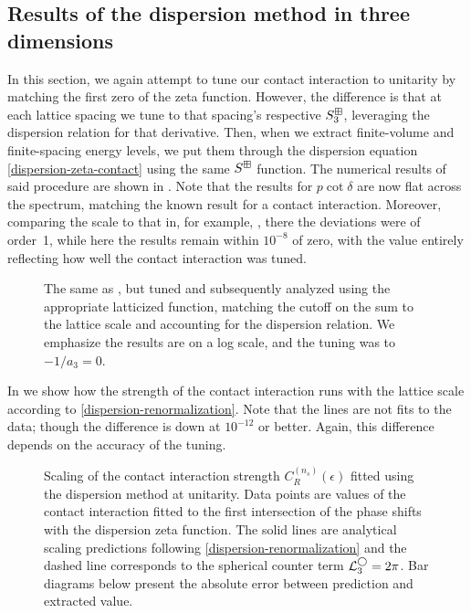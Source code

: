 
\subsection{Results of the dispersion method in three dimensions}

In this section, we again attempt to tune our contact interaction to unitarity by matching the first zero of the zeta function.
However, the difference is that at each lattice spacing we tune to that spacing's respective $S^{\boxplus}_3$, leveraging the dispersion relation for that derivative.
Then, when we extract finite-volume and finite-spacing energy levels, we put them through the dispersion equation \eqref{dispersion-zeta-contact} using the same $S^{\boxplus}$ function.
The numerical results of said procedure are shown in .
Note that the results for $p\cot\delta$ are now flat across the spectrum, matching the known result for a contact interaction.
Moreover, comparing the scale to that in, for example, , there the deviations were of order~1, while here the results remain within $10^{-8}$ of zero, with the value entirely reflecting how well the contact interaction was tuned.

\begin{figure}[!htb]
	\centering
    \scalebox{0.9}{}
    \caption{The same as , but tuned and subsequently analyzed using the appropriate latticized \Luscher function, matching the cutoff on the sum to the lattice scale and accounting for the dispersion relation.
    We emphasize the results are on a log scale, and the tuning was to $-1/a_3 = 0$.
    }
    \label{fig:unimproved dispersion}
\end{figure}

In  we show how the strength of the contact interaction runs with the lattice scale according to \eqref{dispersion-renormalization}.
Note that the lines are not fits to the data; though the difference is down at $10^{-12}$ or better.
Again, this difference depends on the accuracy of the tuning.

\begin{figure}[!htb]
	\centering
    \scalebox{0.8}{}
    \caption{
        Scaling of the contact interaction strength $C_R^{(n_s)}(\epsilon)$ fitted using the dispersion method at unitarity.
        Data points are values of the contact interaction fitted to the first intersection of the phase shifts with the dispersion zeta function.
        The solid lines are analytical scaling predictions following \eqref{dispersion-renormalization} and the dashed line corresponds to the spherical counter term $ \mathcal{L}^{\bigcirc}_3 = 2 \pi$.
        Bar diagrams below present the absolute error between prediction and extracted value.
    }
    \label{fig:dispersion running of strength}
\end{figure}

